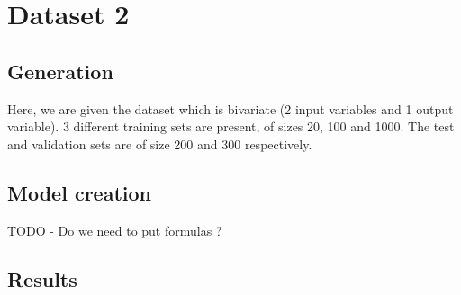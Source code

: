 \documentclass{article}
\begin{document}
\section{Dataset 2}

\subsection{Generation}
Here, we are given the dataset which is bivariate (2 input variables and 1 output variable). 3 different training sets are present, of sizes 20, 100 and 1000. The test and validation sets are of size 200 and 300 respectively.
\subsection{Model creation}

TODO - Do we need to put formulas ?


\subsection{Results}
\end{document}
